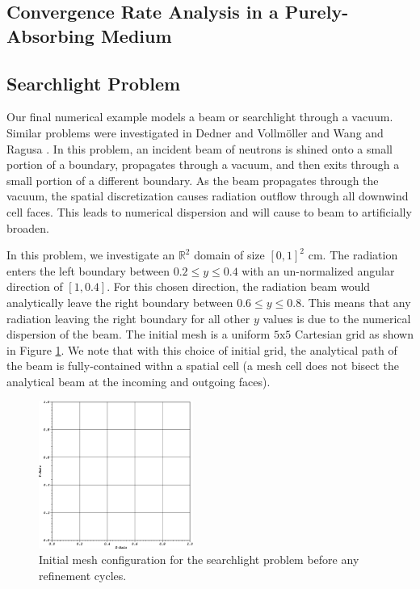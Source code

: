 \subsection{Convergence Rate Analysis in a Purely-Absorbing Medium}
\label{sec::BF_Results_PA}



\subsection{Searchlight Problem}
\label{sec::BF_Results_SL}

Our final numerical example models a beam or searchlight through a vacuum. Similar problems were investigated in Dedner and Vollm{\"o}ller \cite{dedner2002adaptive} and Wang and Ragusa \cite{wang2011standard}. In this problem, an incident beam of neutrons is shined onto a small portion of a boundary, propagates through a vacuum, and then exits through a small portion of a different boundary. As the beam propagates through the vacuum, the spatial discretization causes radiation outflow through all downwind cell faces. This leads to numerical dispersion and will cause to beam to artificially broaden.

In this problem, we investigate an $\mathbb{R}^2$ domain of size $[0,1]^2$ cm. The radiation enters the left boundary between $0.2 \leq y \leq 0.4$ with an un-normalized angular direction of $[1,0.4]$. For this chosen direction, the radiation beam would analytically leave the right boundary between $0.6 \leq y \leq 0.8$. This means that any radiation leaving the right boundary for all other $y$ values is due to the numerical dispersion of the beam. The initial mesh is a uniform $5 \text{x} 5$ Cartesian grid as shown in Figure \ref{fig::BF_Results_SL_starting_mesh}. We note that with this choice of initial grid, the analytical path of the beam is fully-contained withn a spatial cell (a mesh cell does not bisect the analytical beam at the incoming and outgoing faces). 

\begin{figure}
\centering
\includegraphics[width=0.45\textwidth]{figures/sec_BF/searchlight_starting_mesh.eps}
\caption{Initial mesh configuration for the searchlight problem before any refinement cycles.}
\label{fig::BF_Results_SL_starting_mesh}
\end{figure}

